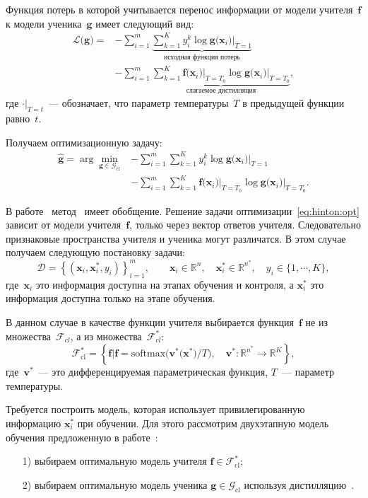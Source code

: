 \documentclass[12pt, twoside]{article}
\begin{document}
Функция потерь в которой учитывается перенос информации от модели учителя~$\mathbf{f}$ к модели ученика~$\mathbf{g}$ имеет следующий вид:
\[
\label{eq:hinton:1}
\begin{aligned}
   \mathcal{L}\bigr(\mathbf{g}\bigr) = &-\sum_{i=1}^{m}\underbrace{{\sum_{k=1}^{K}y^k_i\log\mathbf{g}\bigr(\mathbf{x}_i\bigr)\bigr|_{T=1}}}_{\text{исходная функция потерь}}\\
   &-\sum_{i=1}^{m}\underbrace{{\sum_{k=1}^{K}\mathbf{f}\bigr(\mathbf{x}_i\bigr)\bigr|_{T=T_0}\log\mathbf{g}\bigr(\mathbf{x}_i\bigr)\bigr|_{T=T_0}}}_{\text{слагаемое дистилляция}},
\end{aligned}
\]
где $\cdot\bigr|_{T=t}$~--- обозначает, что параметр температуры~$T$ в предыдущей функции равно~$t$.

Получаем оптимизационную задачу:
\[
\label{eq:hinton:opt}
\begin{aligned}
   \hat{\mathbf{g}} = \arg\min_{\mathbf{g} \in \mathcal{G}_{\text{cl}}} &-\sum_{i=1}^{m}{\sum_{k=1}^{K}y^k_i\log\mathbf{g}\bigr(\mathbf{x}_i\bigr)\bigr|_{T=1}}\\
   &-\sum_{i=1}^{m}{\sum_{k=1}^{K}\mathbf{f}\bigr(\mathbf{x}_i\bigr)\bigr|_{T=T_0}\log\mathbf{g}\bigr(\mathbf{x}_i\bigr)\bigr|_{T=T_0}}.
\end{aligned}
\]

В работе~\cite{Lopez2016} метод~\cite{Hinton2015} имеет обобщение. Решение задачи оптимизации~\eqref{eq:hinton:opt} зависит от модели учителя~$\mathbf{f}$, только через вектор ответов учителя. Следовательно признаковые пространства учителя и ученика могут различатся. В этом случае получаем следующую постановку задачи:
\[
    \mathcal{D} = \left\{\left(\mathbf{x}_i, \mathbf{x}^*_i, y_i\right)\right\}_{i=1}^{m}, \qquad \mathbf{x}_i \in \mathbb{R}^{n}, \quad \mathbf{x}^*_i \in \mathbb{R}^{n^*}, \quad y_i \in \{1, \cdots, K\},
\]
где~$\mathbf{x}_i$ это информация доступна на этапах обучения и контроля, а $\mathbf{x}^*_i$ это информация доступна только на этапе обучения.

В данном случае в качестве функции учителя выбирается функция~$\mathbf{f}$ не из множества~$\mathcal{F}_{cl}$, а из множества~$\mathcal{F}_{cl}^*$:
\[
\label{eq:F:set:cl:priv}
\mathcal{F}_{\text{cl}}^* = \left\{\mathbf{f}| \mathbf{f} = \text{softmax}\bigr(\mathbf{v}^*\bigr(\mathbf{x}^*\bigr)/T\bigr), \quad \mathbf{v}^*: \mathbb{R}^{n^*} \to \mathbb{R}^K \right\},
\]
где~$\mathbf{v}^*$~--- это дифференцируемая параметрическая функция, $T$~--- параметр температуры. 

Требуется построить модель, которая использует привилегированную информацию $\mathbf{x}^*_i$ при обучении. Для этого рассмотрим двухэтапную модель обучения предложенную в работе~\cite{Lopez2016}:
\begin{enumerate}
    \item[1)] выбираем оптимальную модель учителя $\mathbf{f} \in \mathcal{F}_{\text{cl}}^*$;
    \item[2)] выбираем оптимальную модель ученика $\mathbf{g} \in \mathcal{G}_{\text{cl}}$ используя дистилляцию~\cite{Hinton2015}. 
\end{enumerate}
\end{document}
